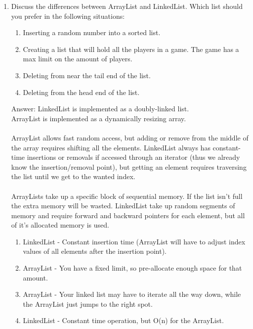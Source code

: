 \documentclass[11pt]{article}
\newenvironment{answer}{\large\lstset{basicstyle=\large\ttfamily}\color{white} \small{Answer:}}{}
\newenvironment{answer}{\large\lstset{basicstyle=\large\ttfamily}\color{red} \small{Answer:}}{}
\begin{document}
\begin{enumerate}
\item Discuss the differences between ArrayList and LinkedList. Which list should you prefer in the following situations:
\begin{enumerate}
\item Inserting a random number into a sorted list.
\item Creating a list that will hold all the players in a game.  The game has a max limit on the amount of players.  
\item Deleting from near the tail end of the list.
\item Deleting from the head end of the list.
\end{enumerate}
\begin{answer}
LinkedList is implemented as a doubly-linked list.
\\ArrayList is implemented as a dynamically resizing array.
\\ \\ArrayList allows fast random access, but adding or remove from the middle of the array
requires shifting all the elements. LinkedList always has constant-time insertions or removals
if accessed through an iterator (thus we already know the insertion/removal point), but getting
an element requires traversing the list until we get to the wanted index.
\\ \\ArrayLists take up a specific block of sequential memory. If the list isn't full the extra
memory will be wasted. LinkedList take up random segments of memory and require
forward and backward pointers for each element, but all of it's allocated memory is used.
\begin{enumerate}
\item LinkedList - Constant insertion time (ArrayList will have to adjust index values of all elements after the insertion point).
\item ArrayList - You have a fixed limit, so pre-allocate enough space for that amount.
\item ArrayList - Your linked list may have to iterate all the way down, while the ArrayList just jumps to the right spot.
\item LinkedList - Constant time operation, but O(n) for the ArrayList.
\end{enumerate}
\end{answer}



\end{enumerate}
\end{document}
